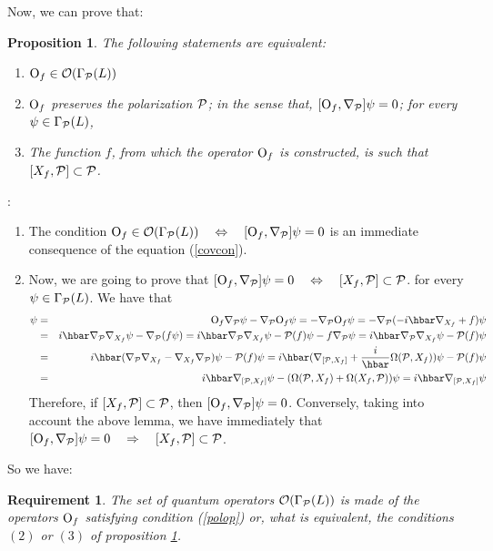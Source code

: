 \documentclass[12pt]{article}
\theoremstyle{plain}
\newtheorem{prop}{Proposition}
\newtheorem{require}{Requirement}
\def\beann{\begin{eqnarray*}}
\def\eeann{\end{eqnarray*}}
\def\qed{\ifvmode\removelastskip\fi
{\unskip\nobreak\hfil\penalty50\hbox{}\nobreak\hfil
\hbox{\vrule height1.2ex width1.2ex}\parfillskip=0pt
\finalhyphendemerits=0 \par\smallskip}}
\def\P{{\cal P}}
\def\Op{{\rm O}}
\begin{document}
\medskip\noindent Now, we can prove that:

\begin{prop}
The following statements are equivalent:
\begin{enumerate}
\item
$\Op_f \in {\cal O} (\Gamma_\P (L))$
\item
$\Op_f$ preserves the polarization $\P$; in the sense that,
$[\Op_f,\nabla_{\P}] \psi = 0$;
for every $\psi \in \Gamma_\P (L)$,
\item
The function $f$, from which the operator $\Op_f$ is constructed, is
such that
$[X_f,\P] \subset \P$.
\end{enumerate}
\label{cnspo}
\end{prop}
: 
\begin{enumerate}
\item
The condition
$\Op_f \in {\cal O} (\Gamma_\P (L)) \quad \Leftrightarrow \quad
[\Op_f,\nabla_{\P}] \psi = 0$
is an immediate consequence of the equation (\ref{covcon}).
\item
Now, we are going to prove that
$[\Op_f,\nabla_{\P}] \psi = 0
\quad \Leftrightarrow \quad
[X_f,\P] \subset \P$.
for every $\psi \in \Gamma_\P (L)$. We have that
\beann
[\Op_f,\nabla_{\P}] \psi
&=&
\Op_f\nabla_\P \psi - \nabla_\P \Op_f \psi =
-\nabla_\P \Op_f \psi =
-\nabla_\P (-i\hbar\nabla_{X_f}+f)\psi
\\ &=&
i\hbar\nabla_\P \nabla_{X_f}\psi - \nabla_\P (f\psi ) =
i\hbar\nabla_\P \nabla_{X_f}\psi - \P (f)\psi - f\nabla_\P \psi =
i\hbar\nabla_\P \nabla_{X_f}\psi - \P (f)\psi
\\ &=&
i\hbar(\nabla_\P \nabla_{X_f}-\nabla_{X_f}\nabla_{\P})\psi - \P (f)\psi
=
i\hbar(\nabla_{[\P ,X_f]}+\frac{i}{\hbar}\Omega (\P ,X_f))\psi - \P
(f)\psi
\\ &=&
i\hbar\nabla_{[\P ,X_f]}\psi - (\Omega (\P ,X_f) + \Omega (X_f,\P
))\psi  =
i\hbar\nabla_{[\P ,X_f]}\psi
\eeann
Therefore, if $[X_f,\P ] \subset \P$, then
$[\Op_f,\nabla_{\P}] \psi = 0$.
Conversely, taking into account the above lemma,
we have immediately that
$[\Op_f,\nabla_{\P}] \psi = 0
\quad \Rightarrow \quad
[X_f,\P] \subset \P$.
\end{enumerate}
\qed

So we have:

\begin{require}
The set of quantum operators
${\cal O} (\Gamma_\P (L))$
is made of the operators $\Op_f$ satisfying condition
(\ref{polop}) or, what is equivalent,
the conditions $(2)$ or $(3)$ of proposition \ref{cnspo}.
\label{quanop}
\end{require}
\end{document}
